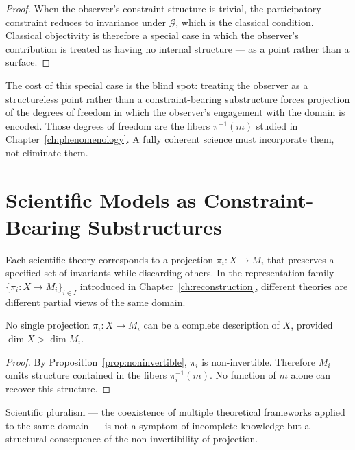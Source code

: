 \documentclass[11pt,openany]{book}
\begin{document}
\begin{proof}
When the observer's constraint structure is trivial, the
participatory constraint reduces to invariance under
$\mathcal{G}$, which is the classical condition.
Classical objectivity is therefore a special case in which
the observer's contribution is treated as having no
internal structure — as a point rather than a surface.
\end{proof}

The cost of this special case is the blind spot: treating
the observer as a structureless point rather than a
constraint-bearing substructure forces projection of the
degrees of freedom in which the observer's engagement with
the domain is encoded.  Those degrees of freedom are the
fibers $\pi^{-1}(m)$ studied in
Chapter~\ref{ch:phenomenology}.  A fully coherent science
must incorporate them, not eliminate them.

\section{Scientific Models as Constraint-Bearing Substructures}
\label{sec:models-substructures}

Each scientific theory corresponds to a projection
$\pi_i : X \to M_i$ that preserves a specified set of
invariants while discarding others.  In the representation
family $\{\pi_i : X \to M_i\}_{i \in I}$ introduced in
Chapter~\ref{ch:reconstruction}, different theories are
different partial views of the same domain.

\begin{proposition}
\label{prop:incompleteness}
No single projection $\pi_i : X \to M_i$ can be a
complete description of $X$, provided $\dim X > \dim M_i$.
\end{proposition}

\begin{proof}
By Proposition~\ref{prop:noninvertible}, $\pi_i$ is
non-invertible.  Therefore $M_i$ omits structure contained
in the fibers $\pi_i^{-1}(m)$.  No function of $m$ alone
can recover this structure.
\end{proof}

\begin{corollary}
\label{cor:pluralism}
Scientific pluralism --- the coexistence of multiple
theoretical frameworks applied to the same domain --- is
not a symptom of incomplete knowledge but a structural
consequence of the non-invertibility of projection.
\end{corollary}
\end{document}
